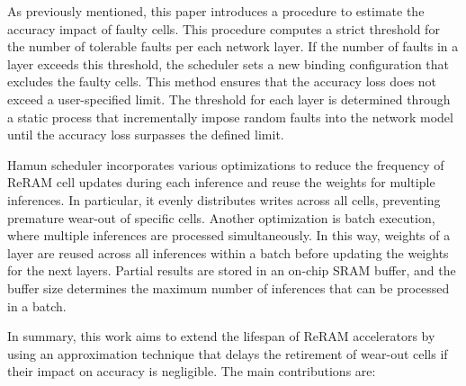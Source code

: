 As previously mentioned, this paper introduces a procedure to estimate the accuracy impact of faulty cells. This procedure computes a strict threshold for the number of tolerable faults per each network layer. If the number of faults in a layer exceeds this threshold, the scheduler sets a new binding configuration that excludes the faulty cells. This method ensures that the accuracy loss does not exceed a user-specified limit. The threshold for each layer is determined through a static process that incrementally impose random faults into the network model until the accuracy loss surpasses the defined limit.


Hamun scheduler incorporates various optimizations to reduce the frequency of ReRAM cell updates during each inference and reuse the weights for multiple inferences. In particular, it evenly distributes writes across all cells, preventing premature wear-out of specific cells. Another optimization is batch execution, where multiple inferences are processed simultaneously. In this way, weights of a layer are reused across all inferences within a batch before updating the weights for the next layers. Partial results are stored in an on-chip SRAM buffer, and the buffer size determines the maximum number of inferences that can be processed in a batch.


In summary, this work aims to extend the lifespan of ReRAM accelerators by using an approximation technique that delays the retirement of wear-out cells if their impact on accuracy is negligible. The main contributions are:


